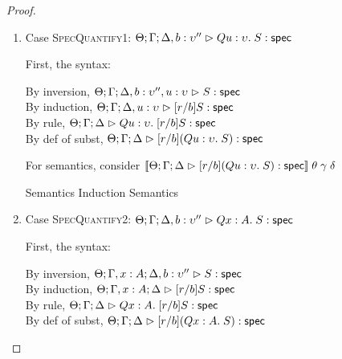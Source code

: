 \begin{proof}
\begin{enumerate}
\item Case \textsc{SpecQuantify1}: $\judgeS[\Theta; \Gamma; \Delta, b:\upsilon'']{Q u:\upsilon.\;S}$
  
  First, the syntax:
  \begin{tabbedproof}
    \oo By inversion, $\judgeS[\Theta; \Gamma; \Delta, b:\upsilon'', u:\upsilon]{S}$ \\
    \oo By induction, $\judgeS[\Theta; \Gamma; \Delta, u:\upsilon]{[r/b]S}$ \\
    \oo By rule, $\judgeS[\Theta; \Gamma; \Delta]
                         {Q u:\upsilon.\;[r/b]S}$ \\
    \oo By def of subst, $\judgeS[\Theta; \Gamma; \Delta]
                                 {[r/b](Q u:\upsilon.\;S)}$ 
  \end{tabbedproof}

  For semantics, consider
  $\interp{\judgeS[\Theta; \Gamma; \Delta]
                  {[r/b](Q u:\upsilon.\;S)}}\;\theta\;\gamma\;\delta$ 
  \begin{eqnproof}
          {Semantics}
          {Induction}
          {Semantics}
  \end{eqnproof}

\item Case \textsc{SpecQuantify2}: $\judgeS[\Theta; \Gamma; \Delta, b:\upsilon'']{Q x:A.\;S}$
  
  First, the syntax:
  \begin{tabbedproof}
    \oo By inversion, $\judgeS[\Theta; \Gamma, x:A; \Delta, b:\upsilon'']{S}$ \\
    \oo By induction, $\judgeS[\Theta; \Gamma, x:A; \Delta]{[r/b]S}$ \\
    \oo By rule, $\judgeS[\Theta; \Gamma; \Delta]
                         {Q x:A.\;[r/b]S}$ \\
    \oo By def of subst, $\judgeS[\Theta; \Gamma; \Delta]
                                 {[r/b](Q x:A.\;S)}$ 
  \end{tabbedproof}


\end{enumerate}
\end{proof}
